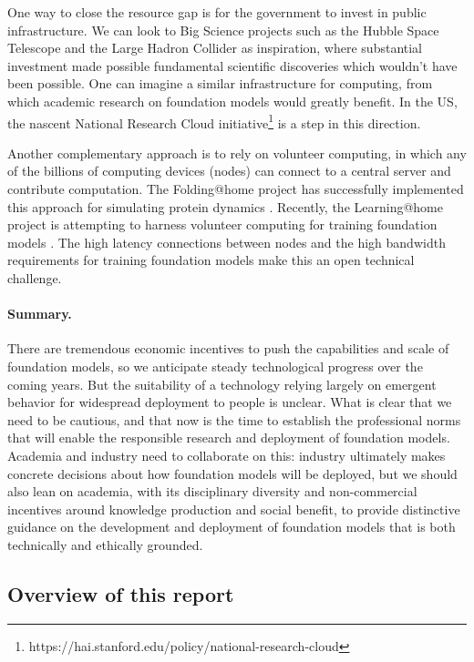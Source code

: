 One way to close the resource gap is for the government to invest in public infrastructure. We can look to Big Science projects such as the Hubble Space Telescope and the Large Hadron Collider as inspiration, where substantial investment made possible fundamental scientific discoveries which wouldn't have been possible. One can imagine a similar infrastructure for computing, from which academic research on foundation models would greatly benefit. In the US, the nascent National Research Cloud initiative\footnote{https://hai.stanford.edu/policy/national-research-cloud} is a step in this direction.

Another complementary approach is to rely on volunteer computing, in which any of the billions of computing devices (nodes) can connect to a central server and contribute computation. The Folding@home project has successfully implemented this approach for simulating protein dynamics \citep{beberg2009folding}. Recently, the Learning@home project is attempting to harness volunteer computing for training foundation models \citep{Ryabinin2020Learninghome}. The high latency connections between nodes and the high bandwidth requirements for training foundation models make this an open technical challenge.

\paragraph{Summary.}

There are tremendous economic incentives to push the capabilities and scale of foundation models, so we anticipate steady technological progress over the coming years. But the suitability of a technology relying largely on emergent behavior for widespread deployment to people is unclear. What is clear that we need to be cautious, and that now is the time to establish the professional norms that will enable the responsible research and deployment of foundation models. Academia and industry need to collaborate on this: industry ultimately makes concrete decisions about how foundation models will be deployed, but we should also lean on academia, with its disciplinary diversity and non-commercial incentives around knowledge production and social benefit, to provide distinctive guidance on the development and deployment of foundation models that is both technically and ethically grounded.

\subsection{Overview of this report}
\label{sec:overview}

